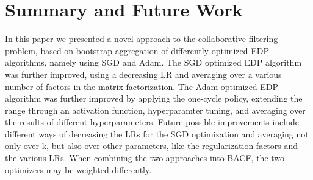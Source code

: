 \section{Summary and Future Work}
\label{sec:summary}

In this paper we presented a novel approach to the collaborative filtering problem, based on bootstrap aggregation of differently optimized \ac{EDP} algorithms, namely using \ac{SGD} and Adam. The \ac{SGD} optimized \ac{EDP} algorithm was further improved, using a decreasing \ac{LR} and averaging over a various number of factors in the matrix factorization. The Adam optimized \ac{EDP} algorithm was further improved by applying the one-cycle policy, extending the range through an activation function, hyperparamter tuning, and averaging over the results of different hyperparameters. Future possible improvements include different ways of decreasing the \ac{LR}s for the \ac{SGD} optimization\cite{lau_2020} and averaging not only over k, but also over other parameters, like the regularization factors and the various \ac{LR}s. When combining the two approaches into \ac{BACF}, the two optimizers may be weighted differently.